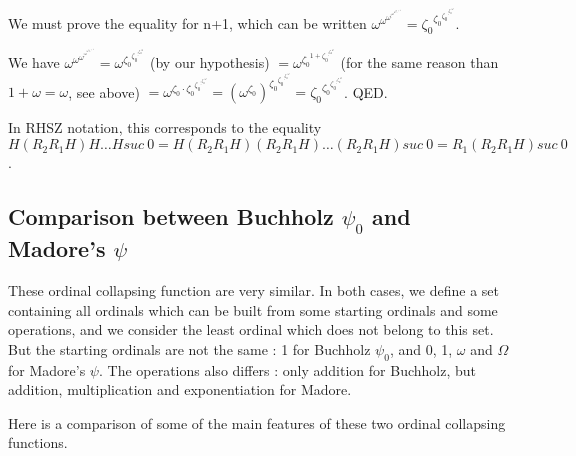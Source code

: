 \documentclass[10pt]{article}
\begin{document}
We must prove the equality for n+1, which can be written \( \omega^{\omega^{\omega^{\vdots^{\omega^{\omega^{\varepsilon_{\zeta_0}+1}}}}}} = {\zeta_0}^{{\zeta_0}^{{\zeta_0}^{\vdots^{{\zeta_0}^\omega}}}} \). 

We have \( \omega^{\omega^{\omega^{\vdots^{\omega^{\omega^{\varepsilon_{\zeta_0}+1}}}}}} = \omega^{{\zeta_0}^{{\zeta_0}^{\vdots^{{\zeta_0}^\omega}}}} \) (by our hypothesis) \( = \omega^{{\zeta_0}^{1+{\zeta_0}^{\vdots^{{\zeta_0}^\omega}}}} \) (for the same reason than \( 1+\omega = \omega \), see above) \( = \omega^{{\zeta_0} \cdot {\zeta_0}^{{\zeta_0}^{\vdots^{{\zeta_0}^\omega}}}} = (\omega^{\zeta_0})^{{\zeta_0}^{{\zeta_0}^{\vdots^{{\zeta_0}^\omega}}}} = {\zeta_0}^{{\zeta_0}^{{\zeta_0}^{\vdots^{{\zeta_0}^\omega}}}} \). QED.

In RHSZ notation, this corresponds to the equality \( H (R_2 R_1 H) H \ldots H suc\ 0 = H (R_2 R_1 H) (R_2 R_1 H) \ldots (R_2 R_1 H) suc\ 0 = R_1 (R_2 R_1 H) suc\ 0 \).

\subsection{Comparison between Buchholz \( \psi_0 \) and Madore's \( \psi \)}

These ordinal collapsing function are very similar. In both cases, we define a set containing all ordinals which can be built from some starting ordinals and some operations, and we consider the least ordinal which does not belong to this set. But the starting ordinals are not the same : 1 for Buchholz \( \psi_0 \), and 0, 1, \( \omega \) and \( \Omega \) for Madore's \( \psi \). The operations also differs : only addition for Buchholz, but addition, multiplication and exponentiation for Madore. 

\bigskip

Here is a comparison of some of the main features of these two ordinal collapsing functions.

\bigskip
\end{document}
